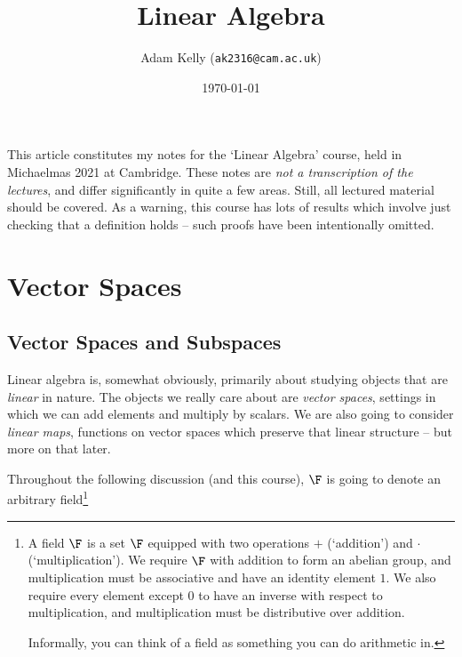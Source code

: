\documentclass[a4paper]{scrartcl}
\title{Linear Algebra}
\author{Adam Kelly (\texttt{ak2316@cam.ac.uk})}
\date{\today}
\begin{document}
\maketitle


This article constitutes my notes for the `Linear Algebra' course, held in Michaelmas 2021 at Cambridge. These notes are \emph{not a transcription of the lectures}, and differ significantly in quite a few areas. Still, all lectured material should be covered. As a warning, this course has lots of results which involve just checking that a definition holds -- such proofs have been intentionally omitted.


\tableofcontents

\section{Vector Spaces}

\subsection{Vector Spaces and Subspaces}

Linear algebra is, somewhat obviously, primarily about studying objects that are \emph{linear} in nature. The objects we really care about are \emph{vector spaces}, settings in which we can add elements and multiply by scalars. We are also going to consider \emph{linear maps}, functions on vector spaces which preserve that linear structure -- but more on that later. 

Throughout the following discussion (and this course), $\F$ is going to denote an arbitrary field\footnote{A field $\F$ is a set $\F$ equipped with two operations $+$ (`addition') and $\cdot$ (`multiplication'). We require $\F$ with addition to form an abelian group, and multiplication must be associative and have an identity element $1$. We also require every element except $0$ to have an inverse with respect to multiplication, and multiplication must be distributive over addition.

Informally, you can think of a field as something you can do arithmetic in.}
\end{document}

